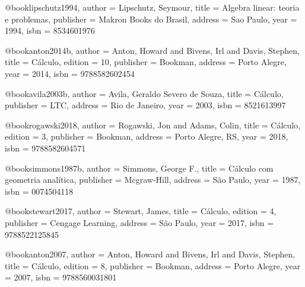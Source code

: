@book{lipschutz1994,
  author = {Lipschutz, Seymour},
  title = {Algebra linear: teoria e problemas},
  publisher = {Makron Books do Brasil},
  address = {Sao Paulo},
  year = {1994},
  isbn = {8534601976}%
}

%

@book{anton2014b,
  author = {Anton, Howard and Bivens, Irl and Davis, Stephen},
  title = {Cálculo},
  edition = {10},
  publisher = {Bookman},
  address = {Porto Alegre},
  year = {2014},
  isbn = {9788582602454}
}

@book{avila2003b,
  author = {Avila, Geraldo Severo de Souza},
  title = {Cálculo},
  publisher = {LTC},
  address = {Rio de Janeiro},
  year = {2003},%
  isbn = {8521613997}%
}

@book{rogawski2018,
  author = {Rogawski, Jon and Adams, Colin},
  title = {Cálculo},
  edition = {3},
  publisher = {Bookman},
  address = {Porto Alegre, RS},
  year = {2018},
  isbn = {9788582604571}
}

@book{simmons1987b,
  author = {Simmons, George F.},
  title = {Cálculo com geometria analítica},
  publisher = {Mcgraw-Hill},
  address = {São Paulo},
  year = {1987},
  isbn = {0074504118}
}

@book{stewart2017,
  author = {Stewart, James},
  title = {Cálculo},
  edition = {4},
  publisher = {Cengage Learning},
  address = {São Paulo},
  year = {2017},
  isbn = {9788522125845}
}

@book{anton2007,
  author = {Anton, Howard and Bivens, Irl and Davis, Stephen},
  title = {Cálculo},
  edition = {8},
  publisher = {Bookman},
  address = {Porto Alegre},
  year = {2007},
  isbn = {9788560031801}
}

